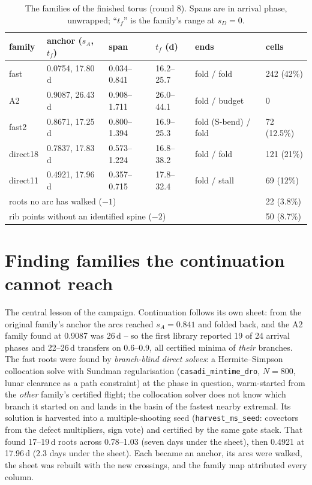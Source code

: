 \documentclass[11pt]{article}
\newcommand{\sD}{s_D}
\newcommand{\sA}{s_A}
\newcommand{\tf}{t_f}
\newcommand{\code}[1]{\texttt{#1}}
\begin{document}
\begin{table}[h]\centering
\caption{The families of the finished torus (round 8). Spans are in
arrival phase, unwrapped; ``$\tf$'' is the family's range at $\sD=0$.}
\label{tab:families}
\begin{tabular}{llllll}
\toprule
family & anchor ($\sA$, $\tf$) & span & $\tf$ (d) & ends & cells \\
\midrule
fast & 0.0754, 17.80\,d & 0.034--0.841 & 16.2--25.7 & fold / fold & 242 (42\%) \\
A2 & 0.9087, 26.43\,d & 0.908--1.711 & 26.0--44.1 & fold / budget & 0 \\
fast2 & 0.8671, 17.25\,d & 0.800--1.394 & 16.9--25.3 & fold (S-bend) / fold & 72 (12.5\%) \\
direct18 & 0.7837, 17.83\,d & 0.573--1.224 & 16.8--38.2 & fold / fold & 121 (21\%) \\
direct11 & 0.4921, 17.96\,d & 0.357--0.715 & 17.8--32.4 & fold / stall & 69 (12\%) \\
\midrule
\multicolumn{5}{l}{roots no arc has walked ($-1$)} & 22 (3.8\%) \\
\multicolumn{5}{l}{rib points without an identified spine ($-2$)} & 50 (8.7\%) \\
\bottomrule
\end{tabular}
\end{table}

\section{Finding families the continuation cannot reach}
\label{sec:discovery}

The central lesson of the campaign. Continuation follows its own sheet:
from the original family's anchor the arcs reached $\sA = 0.841$ and
folded back, and the A2 family found at 0.9087 was 26\,d -- so the first
library reported 19 of 24 arrival phases and 22--26\,d transfers on
0.6--0.9, all certified minima of \emph{their} branches. The fast roots
were found by \emph{branch-blind direct solves}: a Hermite--Simpson
collocation solve with Sundman regularisation (\code{casadi\_mintime\_dro},
$N=800$, lunar clearance as a path constraint) at the phase in question,
warm-started from the \emph{other} family's certified flight; the
collocation solver does not know which branch it started on and lands in
the basin of the fastest nearby extremal. Its solution is harvested into
a multiple-shooting seed (\code{harvest\_ms\_seed}: covectors from the
defect multipliers, sign vote) and certified by the same gate stack. That
found 17--19\,d roots across 0.78--1.03 (seven days under the sheet), then
0.4921 at 17.96\,d (2.3 days under the sheet). Each became an anchor, its
arcs were walked, the sheet was rebuilt with the new crossings, and the
family map attributed every column.
\end{document}
